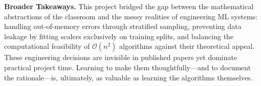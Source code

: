 \textbf{Broader Takeaways.}
This project bridged the gap between the mathematical abstractions of the classroom and the messy realities of engineering ML systems: handling out-of-memory errors through stratified sampling, preventing data leakage by fitting scalers exclusively on training splits, and balancing the computational feasibility of $\mathcal{O}(n^2)$ algorithms against their theoretical appeal. These engineering decisions are invisible in published papers yet dominate practical project time. Learning to make them thoughtfully—and to document the rationale—is, ultimately, as valuable as learning the algorithms themselves.
